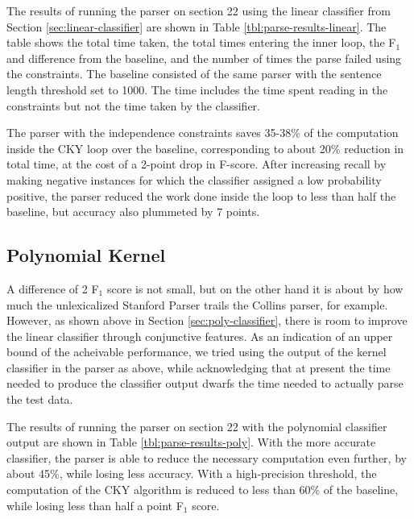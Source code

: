 \documentclass[11pt]{article}
\begin{document}
The results of running the parser on section 22 using the linear
classifier from Section \ref{sec:linear-classifier} are shown in
Table \ref{tbl:parse-results-linear}. The table shows the total time
taken, the total times entering the inner loop, the F$_{\text{1}}$ and difference
from the baseline, and the number of times the parse failed using the
constraints. The baseline consisted of the same parser with the
sentence length threshold set to 1000. The time includes the time
spent reading in the constraints but not the time taken by the
classifier.

The parser with the independence constraints saves 35-38\%
of the computation inside the CKY loop over the baseline,
corresponding to about 20\% reduction in total time, at the cost of a
2-point drop in F-score. After increasing recall by making negative
instances for which the classifier assigned a low probability positive,
the parser reduced the work done inside the loop to less than half the
baseline, but accuracy also plummeted by 7 points.

\subsection{Polynomial Kernel}
\label{sec:results-poly}

A difference of 2 F$_{\text{1}}$ score is not small, but on the other hand it is
about by how much the unlexicalized Stanford Parser trails the Collins
parser, for example. However, as shown above in Section
\ref{sec:poly-classifier}, there is room to improve the linear
classifier through conjunctive features. As an indication of an upper
bound of the acheivable performance, we tried using the output of the
kernel classifier in the parser as above, while acknowledging that at
present the time needed to produce the classifier output dwarfs the
time needed to actually parse the test data.

The results of running the parser on section 22 with the polynomial
classifier output are shown in Table \ref{tbl:parse-results-poly}.
With the more accurate classifier, the parser is able to reduce the
necessary computation even further, by about 45\%, while losing less
accuracy. With a high-precision threshold, the computation of the CKY
algorithm is reduced to less than 60\% of the baseline, while losing
less than half a point F$_{\text{1}}$ score.
\end{document}
